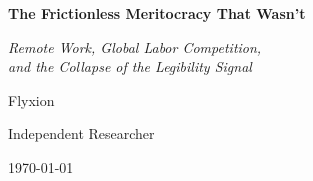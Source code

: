 \documentclass[12pt, a4paper]{article}
\theoremstyle{plain}
\theoremstyle{definition}
\theoremstyle{remark}
\begin{document}
\begin{titlepage}
\centering
\vspace*{2.5cm}

{\LARGE\bfseries The Frictionless Meritocracy That Wasn't\par}
\vspace{0.6em}
{\large\itshape Remote Work, Global Labor Competition,\\
and the Collapse of the Legibility Signal\par}

\vspace{2.5cm}

{\large Flyxion\par}
\vspace{0.4em}
{\normalsize Independent Researcher\par}

\vspace{3cm}
{\small\today\par}
\vfill
\end{titlepage}

\newpage
\end{document}
